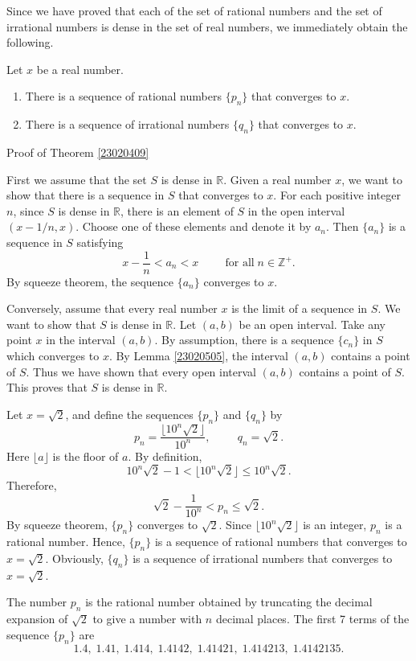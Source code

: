 Since we have proved that each of the set of rational numbers and the set of irrational numbers  is dense in the set of real numbers, we immediately obtain the following.
\begin{corollary}{}
Let $x$ be a real number.
\begin{enumerate}[1.]
\item
There is a sequence of rational numbers $\{p_n\}$ that converges to $x$.
\item There is a sequence of irrational numbers $\{q_n\}$ that converges to $x$.
\end{enumerate}
\end{corollary}


\begin{myproof}{\linkt Proof of Theorem \ref{23020409}}

First we assume that the set $S$ is dense in $\mathbb{R}$. Given a real number $x$, we want to show that there is a sequence in $S$ that converges to $x$. For each positive integer $n$, since $S$ is dense in $\mathbb{R}$, there is an element of $S$ in the open interval $(x-1/n, x)$. Choose one of these elements and denote it by $a_n$. Then $\{a_n\}$ is a sequence in $S$ satisfying
\[x-\frac{1}{n}<a_n<x\hspace{1cm}\text{for all}\;n\in\mathbb{Z}^+.\]
By squeeze theorem, the sequence $\{a_n\}$ converges to $x$.

 

Conversely, assume that every real number $x$ is the limit of a sequence in $S$. We want to show that $S$ is dense in $\mathbb{R}$. 
Let $(a,b)$ be an open interval. Take any point $x$ in the interval $(a,b)$.
By assumption, there is a sequence $\{c_n\}$ in $S$ which converges to $x$. By Lemma \ref{23020505}, the interval $(a,b)$ contains a point of $S$. Thus we have shown that every open interval $(a, b)$ contains a point of $S$. This proves that $S$ is dense in $\mathbb{R}$.
\end{myproof}

\begin{example}[label=23020501]{}
Let $x=\sqrt{2}$, and define the sequences $\{p_n\}$ and $\{q_n\}$ by
\[p_n=\frac{\lfloor 10^n\sqrt{2}\rfloor}{10^n}, \hspace{1cm} q_n=\sqrt{2}.\]
Here $\lfloor a\rfloor$ is the floor of $a$. By definition,
\[10^n\sqrt{2}-1<\lfloor 10^n\sqrt{2}\rfloor\leq 10^n\sqrt{2}.\]
Therefore,
\[\sqrt{2}-\frac{1}{10^n}<p_n\leq \sqrt{2}.\]
By squeeze theorem, 
$\{p_n\}$ converges to $\sqrt{2}$. Since $\lfloor 10^n\sqrt{2}\rfloor$ is an integer, $p_n$ is a rational number. Hence, $\{p_n\}$ is a sequence of rational numbers that converges to $x=\sqrt{2}$. Obviously, $\{q_n\}$ is a sequence of irrational numbers that converges to $x=\sqrt{2}$.
\end{example}
The number $p_n$ is the rational number obtained by truncating the decimal expansion of $\sqrt{2}$ to give a number with $n$ decimal places.
The first 7 terms of the sequence $\{p_n\}$ are
\[1.4, \;1.41, \;1.414, \;1.4142, \;1.41421,\; 1.414213,\; 1.4142135.\]

